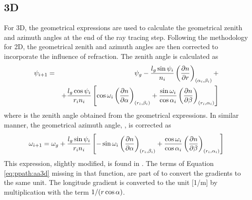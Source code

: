 \subsection{3D}
\label{sec:ppath:refr3D}
For 3D, the geometrical expressions are used to
calculate the geometrical zenith and azimuth angles at the end of the
ray tracing step. Following the methodology for 2D, the geometrical
zenith and azimuth angles are then corrected to incorporate the
influence of refraction. The zenith angle is calculated as
\begin{eqnarray}
  \psi_{i+1} &=& \psi_{g} - \frac{l_g\sin\psi_{i}}{n_i} 
     \left( \frac{\partial n}{\partial r} \right)_{(\alpha_{i},\beta_{i})} + \\
     & &  + \frac{l_g\cos\psi_{i}}{r_{i}n_i}
   \left[
     \cos\omega_{i} 
          \left( \frac{\partial n}{\partial \alpha} \right)_{(r_{i},\beta_{i})}
    +\frac{\sin\omega_{i}}{\cos\alpha_{i}} 
          \left( \frac{\partial n}{\partial \beta} \right)_{(r_{i},\alpha_{i})}
  \right]  \nonumber
  \label{eq:ppath:za3d} 
\end{eqnarray}
where  is the zenith angle obtained from the geometrical
expressions. In similar manner, the geometrical azimuth angle,
, is corrected as
\begin{equation}
  \omega_{i+1} = \omega_{g} + \frac{l_g\sin\psi_{i}}{r_in_i} 
   \left[
    -\sin\omega_{i} 
          \left( \frac{\partial n}{\partial \alpha} \right)_{(r_{i},\beta_{i})}
    +\frac{\cos\omega_{i}}{\cos\alpha_{i}}
          \left( \frac{\partial n}{\partial \beta} \right)_{(r_{i},\alpha_{i})}
  \right]  
  \label{eq:ppath:aa3d} 
\end{equation}
This expression, slightly modified, is found in
. The terms of
Equation \ref{eq:ppath:aa3d} missing in that function, are part of
 to convert the gradients to the same
unit. The longitude gradient is converted to the unit [1/m] by
multiplication with the term $1/(r\cos\alpha)$.











